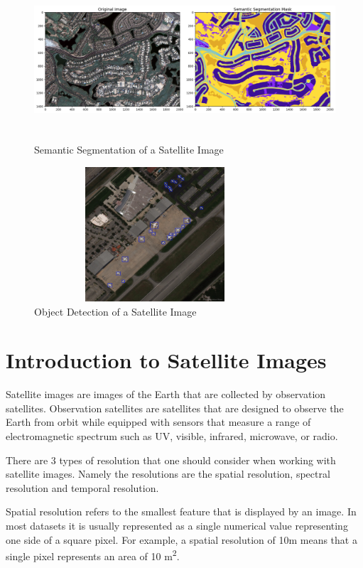 \begin{figure}[ht]
\includegraphics[width=12cm, height=6cm]{images/semantic segmentation example.jpg}
\centering
\caption{Semantic Segmentation of a Satellite Image}
\label{fig:example of semantic segmentation}
\end{figure}

\begin{figure}[ht]
\includegraphics[width=9cm, height=5cm]{images/airport object detection.jpeg}
\centering
\caption{Object Detection of a Satellite Image}
\label{fig:airport object detection}
\end{figure}

\section{Introduction to Satellite Images}

Satellite images are images of the Earth that are collected by observation satellites. Observation satellites are satellites that are designed to observe the Earth from orbit while equipped with sensors that measure a range of  electromagnetic spectrum such as UV, visible, infrared, microwave, or radio. 

There are 3 types of resolution that one should consider when working with satellite images. Namely the resolutions are the spatial resolution, spectral resolution and temporal resolution.

Spatial resolution refers to the smallest feature that is displayed by an image. In most datasets it is usually represented as a single numerical value representing one side of a square pixel. For example, a spatial resolution of 10m means that a single pixel represents an area of 10 m\textsuperscript{2}.

